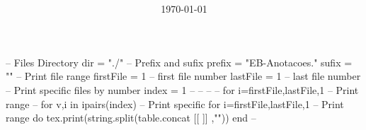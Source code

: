 \documentclass[
    class=article,
    multi={minipage},
    border={3mm},
]{standalone}
\title{\huge\bfseries\color{Emph}\mytitle}
\author{\Large\myauthor}
\date{\Large\today}
\begin{document}
\mymaketitle
\begin{luacode*}
    -- Files Directory
    dir = "./"
    -- Prefix and sufix
    prefix = "EB-Anotacoes."
    sufix  = ""
    -- Print file range
    firstFile = 1 -- first file number
    lastFile  = 1 -- last  file number
    -- Print specific files by number
    index = {1}
    -- %
    -- %
    -- %
    -- for i=firstFile,lastFile,1 -- Print range
    -- for v,i in ipairs(index)   -- Print specific
    for i=firstFile,lastFile,1 -- Print range
    do
        tex.print(string.split(table.concat{
        [[
            \newpage
        ]]
        },"\n"))
    end
    -- %
\end{luacode*}
\end{document}
